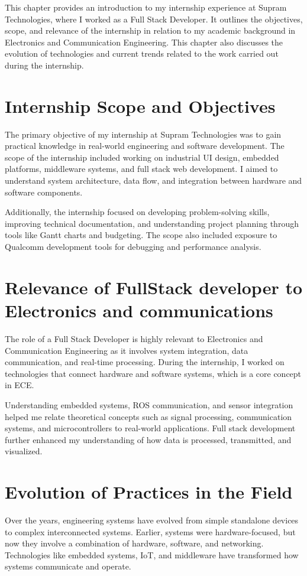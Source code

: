 \documentclass[12pt,a4paper]{report}
\begin{document}
This chapter provides an introduction to my internship experience at Supram Technologies, where I worked as a Full Stack Developer. It outlines the objectives, scope, and relevance of the internship in relation to my academic background in Electronics and Communication Engineering. This chapter also discusses the evolution of technologies and current trends related to the work carried out during the internship.

\section{Internship Scope and Objectives}
The primary objective of my internship at Supram Technologies was to gain practical knowledge in real-world engineering and software development. The scope of the internship included working on industrial UI design, embedded platforms, middleware systems, and full stack web development. I aimed to understand system architecture, data flow, and integration between hardware and software components.

Additionally, the internship focused on developing problem-solving skills, improving technical documentation, and understanding project planning through tools like Gantt charts and budgeting. The scope also included exposure to Qualcomm development tools for debugging and performance analysis.

\section{Relevance of FullStack developer to Electronics and communications}
The role of a Full Stack Developer is highly relevant to Electronics and Communication Engineering as it involves system integration, data communication, and real-time processing. During the internship, I worked on technologies that connect hardware and software systems, which is a core concept in ECE.

Understanding embedded systems, ROS communication, and sensor integration helped me relate theoretical concepts such as signal processing, communication systems, and microcontrollers to real-world applications. Full stack development further enhanced my understanding of how data is processed, transmitted, and visualized.

\section{Evolution of Practices in the Field}
Over the years, engineering systems have evolved from simple standalone devices to complex interconnected systems. Earlier, systems were hardware-focused, but now they involve a combination of hardware, software, and networking. Technologies like embedded systems, IoT, and middleware have transformed how systems communicate and operate.
\end{document}
